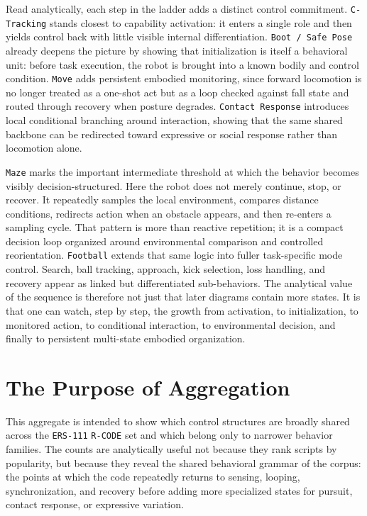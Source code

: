 \documentclass[11pt]{article}
\begin{document}
Read analytically, each step in the ladder adds a distinct control
commitment. \texttt{C-Tracking} stands closest to capability
activation: it enters a single role and then yields control back with
little visible internal differentiation. \texttt{Boot / Safe Pose}
already deepens the picture by showing that initialization is itself a
behavioral unit: before task execution, the robot is brought into a
known bodily and control condition. \texttt{Move} adds persistent
embodied monitoring, since forward locomotion is no longer treated as a
one-shot act but as a loop checked against fall state and routed
through recovery when posture degrades. \texttt{Contact Response}
introduces local conditional branching around interaction, showing that
the same shared backbone can be redirected toward expressive or social
response rather than locomotion alone.

\texttt{Maze} marks the important intermediate threshold at which the
behavior becomes visibly decision-structured. Here the robot does not
merely continue, stop, or recover. It repeatedly samples the local
environment, compares distance conditions, redirects action when an
obstacle appears, and then re-enters a sampling cycle. That pattern is
more than reactive repetition; it is a compact decision loop organized
around environmental comparison and controlled reorientation.
\texttt{Football} extends that same logic into fuller task-specific
mode control. Search, ball tracking, approach, kick selection, loss
handling, and recovery appear as linked but differentiated
sub-behaviors. The analytical value of the sequence is therefore not
just that later diagrams contain more states. It is that one can watch,
step by step, the growth from activation, to initialization, to
monitored action, to conditional interaction, to environmental
decision, and finally to persistent multi-state embodied organization.

\section*{The Purpose of Aggregation}

This aggregate is intended to show which control structures are broadly
shared across the \texttt{ERS-111} \texttt{R-CODE} set and which belong
only to narrower behavior families. The counts are analytically useful
not because they rank scripts by popularity, but because they reveal
the shared behavioral grammar of the corpus: the points at which the
code repeatedly returns to sensing, looping, synchronization, and
recovery before adding more specialized states for pursuit, contact
response, or expressive variation.
\end{document}
